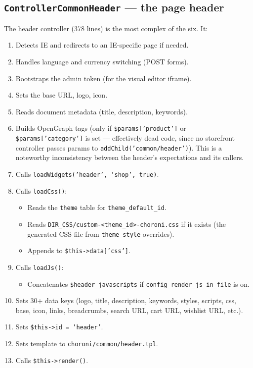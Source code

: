 \documentclass[11pt,a4paper]{article}
\begin{document}
\subsection{\texttt{ControllerCommonHeader} --- the page header}

The header controller (378 lines) is the most complex of the six.
It:

\begin{enumerate}[leftmargin=1.6em,itemsep=2pt]
  \item Detects IE and redirects to an IE-specific page if needed.
  \item Handles language and currency switching (POST forms).
  \item Bootstraps the admin token (for the visual editor iframe).
  \item Sets the base URL, logo, icon.
  \item Reads document metadata (title, description, keywords).
  \item Builds OpenGraph tags (only if \texttt{\$params['product']}
        or \texttt{\$params['category']} is set --- effectively dead
        code, since no storefront controller passes params to
        \texttt{addChild('common/header')}). This is a noteworthy
        inconsistency between the header's expectations and its
        callers.
  \item Calls \texttt{loadWidgets('header', 'shop', true)}.
  \item Calls \texttt{loadCss()}:
        \begin{itemize}[itemsep=2pt]
          \item Reads the \texttt{theme} table for
                \texttt{theme\_default\_id}.
          \item Reads \texttt{DIR\_CSS/custom-<theme\_id>-choroni.css}
                if it exists (the generated CSS file from
                \texttt{theme\_style} overrides).
          \item Appends to \texttt{\$this->data['css']}.
        \end{itemize}
  \item Calls \texttt{loadJs()}:
        \begin{itemize}[itemsep=2pt]
          \item Concatenates \texttt{\$header\_javascripts} if
                \texttt{config\_render\_js\_in\_file} is on.
        \end{itemize}
  \item Sets 30+ data keys (logo, title, description, keywords,
        styles, scripts, css, base, icon, links, breadcrumbs,
        search URL, cart URL, wishlist URL, etc.).
  \item Sets \texttt{\$this->id = 'header'}.
  \item Sets template to \texttt{choroni/common/header.tpl}.
  \item Calls \texttt{\$this->render()}.
\end{enumerate}
\end{document}
